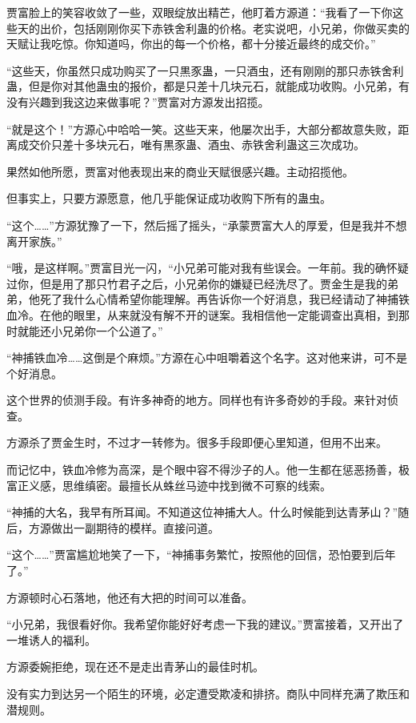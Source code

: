 \begin{this_body}
贾富脸上的笑容收敛了一些，双眼绽放出精芒，他盯着方源道：“我看了一下你这些天的出价，包括刚刚你买下赤铁舍利蛊的价格。老实说吧，小兄弟，你做买卖的天赋让我吃惊。你知道吗，你出的每一个价格，都十分接近最终的成交价。”

“这些天，你虽然只成功购买了一只黒豕蛊，一只酒虫，还有刚刚的那只赤铁舍利蛊，但是你对其他蛊虫的报价，都是只差十几块元石，就能成功收购。小兄弟，有没有兴趣到我这边来做事呢？”贾富对方源发出招揽。

“就是这个！”方源心中哈哈一笑。这些天来，他屡次出手，大部分都故意失败，距离成交价只差十多块元石，唯有黒豕蛊、酒虫、赤铁舍利蛊这三次成功。

果然如他所愿，贾富对他表现出来的商业天赋很感兴趣。主动招揽他。

但事实上，只要方源愿意，他几乎能保证成功收购下所有的蛊虫。

“这个……”方源犹豫了一下，然后摇了摇头，“承蒙贾富大人的厚爱，但是我并不想离开家族。”

“哦，是这样啊。”贾富目光一闪，“小兄弟可能对我有些误会。一年前。我的确怀疑过你，但是用了那只竹君子之后，小兄弟你的嫌疑已经洗尽了。贾金生是我的弟弟，他死了我什么心情希望你能理解。再告诉你一个好消息，我已经请动了神捕铁血冷。在他的眼里，从来就没有解不开的谜案。我相信他一定能调查出真相，到那时就能还小兄弟你一个公道了。”

“神捕铁血冷……这倒是个麻烦。”方源在心中咀嚼着这个名字。这对他来讲，可不是个好消息。

这个世界的侦测手段。有许多神奇的地方。同样也有许多奇妙的手段。来针对侦查。

方源杀了贾金生时，不过才一转修为。很多手段即便心里知道，但用不出来。

而记忆中，铁血冷修为高深，是个眼中容不得沙子的人。他一生都在惩恶扬善，极富正义感，思维缜密。最擅长从蛛丝马迹中找到微不可察的线索。

“神捕的大名，我早有所耳闻。不知道这位神捕大人。什么时候能到达青茅山？”随后，方源做出一副期待的模样。直接问道。

“这个……”贾富尴尬地笑了一下，“神捕事务繁忙，按照他的回信，恐怕要到后年了。”

方源顿时心石落地，他还有大把的时间可以准备。

“小兄弟，我很看好你。我希望你能好好考虑一下我的建议。”贾富接着，又开出了一堆诱人的福利。

方源委婉拒绝，现在还不是走出青茅山的最佳时机。

没有实力到达另一个陌生的环境，必定遭受欺凌和排挤。商队中同样充满了欺压和潜规则。


\end{this_body}
